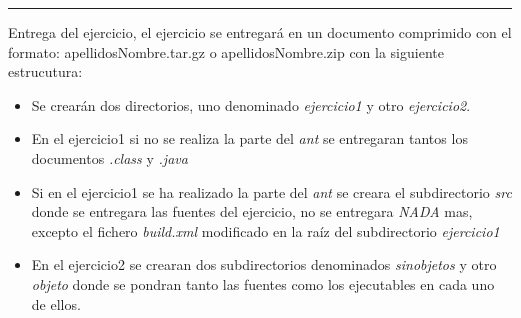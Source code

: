 \documentclass[addpoints,12pt]{exam}
\begin{document}
\begin{questions}
\end{questions}
\vspace{0,5cm}
\hrule
\vspace{0,5cm}
Entrega del ejercicio, el ejercicio se entregará en un documento comprimido con el formato: apellidosNombre.tar.gz o apellidosNombre.zip con la siguiente estrucutura:
\begin{itemize}
\item Se crearán dos directorios, uno denominado \emph{ejercicio1} y otro \emph{ejercicio2}.
\item En el ejercicio1 si no se realiza la parte del \emph{ant} se entregaran tantos los documentos \emph{.class} y \emph{.java}
\item Si en el ejercicio1 se ha realizado la parte del \emph{ant} se creara el subdirectorio \emph{src} donde se entregara las fuentes del ejercicio, no se entregara \emph{NADA} mas, excepto el fichero \emph{build.xml} modificado en la raíz del subdirectorio \emph{ejercicio1}
\item En el ejercicio2 se crearan dos subdirectorios denominados \emph{sinobjetos} y otro \emph{objeto} donde se pondran tanto las fuentes como los ejecutables en cada uno de ellos.
\end{itemize}
\end{document}
